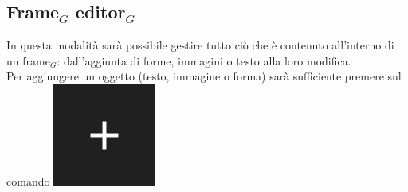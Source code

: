\subsection{Frame$_G$ editor$_G$}
In questa modalità sarà possibile gestire tutto ciò che è contenuto all'interno di un frame$_G$: dall'aggiunta di forme,  immagini o testo alla loro modifica.
\\
Per aggiungere un oggetto (testo, immagine o forma) sarà sufficiente premere sul comando \includegraphics[scale=0.4]{img/add_object.png}\\


